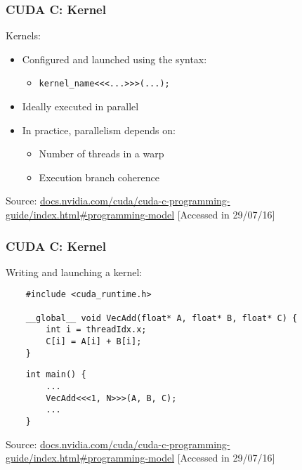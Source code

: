 \documentclass[10pt, compress]{beamer}
\begin{document}
\begin{frame}
    \frametitle{CUDA C: Kernel}
    \alert{Kernels}:
    \begin{itemize}
        \item Configured and launched using the syntax:
            \begin{itemize}
                \item \texttt{kernel\_name\alert{<<<}...\alert{>>>}(...);}
            \end{itemize}
            \pause
        \item Ideally executed in \alert{parallel}
            \pause
        \item In practice, parallelism depends on:
            \begin{itemize}
                \item Number of threads in a warp
                    \pause
                \item Execution branch coherence
            \end{itemize}
    \end{itemize}

    \vfill

    \begin{center}
        \tiny{Source: \url{docs.nvidia.com/cuda/cuda-c-programming-guide/index.html\#programming-model} [Accessed in 29/07/16]}
    \end{center}
\end{frame}

\begin{frame}[fragile]
    \frametitle{CUDA C: Kernel}
    Writing and \alert{launching} a \alert{kernel}:
    \begin{lstlisting}
    #include <cuda_runtime.h>

    __global__ void VecAdd(float* A, float* B, float* C) {
        int i = threadIdx.x;
        C[i] = A[i] + B[i];
    }
    \end{lstlisting}
    \pause
    \begin{lstlisting}
    int main() {
        ...
        VecAdd<<<1, N>>>(A, B, C);
        ...
    }
    \end{lstlisting}
    \vfill

    \begin{center}
        \tiny{Source: \url{docs.nvidia.com/cuda/cuda-c-programming-guide/index.html\#programming-model} [Accessed in 29/07/16]}
    \end{center}
\end{frame}
\end{document}
